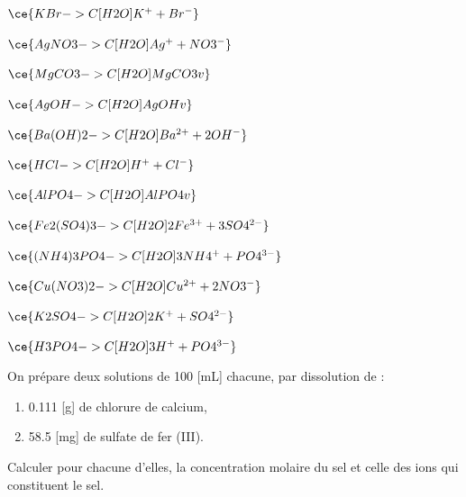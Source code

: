 \documentclass[
  11pt,
  a4paper,
  openany]{book}
\providecommand{\tightlist}{%
  \setlength{\itemsep}{0pt}\setlength{\parskip}{0pt}}
\begin{document}
\begin{Answer}

\begin{multicols}{2}
\(\ce{KBr ->C[H2O] K^{+} + Br^{-} }\)

\(\ce{AgNO3 ->C[H2O] Ag^{+} + NO3^{-} }\)

\(\ce{MgCO3 ->C[H2O] MgCO3 v }\)

\(\ce{AgOH ->C[H2O] AgOH v }\)

\(\ce{Ba(OH)2 ->C[H2O] Ba^{2+} + 2OH^{-} }\)

\(\ce{HCl ->C[H2O] H^{+} + Cl^{-}}\)

\(\ce{AlPO4 ->C[H2O] AlPO4 v }\)

\(\ce{Fe2(SO4)3 ->C[H2O] 2Fe^{3+} + 3SO4^{2-} }\)

\(\ce{(NH4)3PO4 ->C[H2O] 3NH4^{+} + PO4^{3-} }\)

\(\ce{Cu(NO3)2 ->C[H2O] Cu^{2+} + 2NO3^{-} }\)

\(\ce{K2SO4 ->C[H2O] 2K^{+} + SO4^{2-} }\)

\(\ce{H3PO4 ->C[H2O] 3H^{+} + PO4^{3-} }\)

\end{multicols}

\end{Answer}

\begin{Exercise}

On prépare deux solutions de 100 {[}mL{]} chacune, par dissolution de :

\begin{enumerate}
\def\labelenumi{\arabic{enumi}.}
\tightlist
\item
  0.111 {[}g{]} de chlorure de calcium,
\item
  58.5 {[}mg{]} de sulfate de fer (III).
\end{enumerate}

Calculer pour chacune d'elles, la concentration molaire du sel et celle des ions qui constituent le sel.


\end{Exercise}
\end{document}
